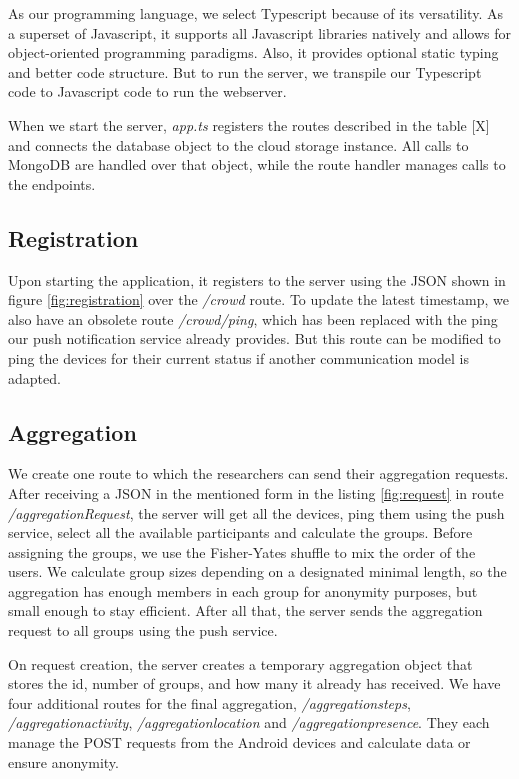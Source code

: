 As our programming language, we select Typescript because of its versatility. As a superset of Javascript, it supports all Javascript libraries natively and allows for object-oriented programming paradigms. Also, it provides optional static typing and better code structure. But to run the server, we transpile our Typescript code to Javascript code to run the webserver.

When we start the server, \textit{app.ts} registers the routes described in the table [X] and connects the database object to the cloud storage instance. All calls to MongoDB are handled over that object, while the route handler manages calls to the endpoints.

\subsection{Registration}

Upon starting the application, it registers to the server using the JSON shown in figure \ref{fig:registration} over the \textit{/crowd} route. To update the latest timestamp, we also have an obsolete route \textit{/crowd/ping}, which has been replaced with the ping our push notification service already provides. But this route can be modified to ping the devices for their current status if another communication model is adapted.

\subsection{Aggregation}

We create one route to which the researchers can send their aggregation requests. After receiving a JSON in the mentioned form in the listing \ref{fig:request} in route \textit{/aggregationRequest}, the server will get all the devices, ping them using the push service, select all the available participants and calculate the groups. Before assigning the groups, we use the Fisher-Yates shuffle to mix the order of the users. We calculate group sizes depending on a designated minimal length, so the aggregation has enough members in each group for anonymity purposes, but small enough to stay efficient. After all that, the server sends the aggregation request to all groups using the push service.

On request creation, the server creates a temporary aggregation object that stores the id, number of groups, and how many it already has received. We have four additional routes for the final aggregation, \textit{/aggregationsteps}, \textit{/aggregationactivity}, \textit{/aggregationlocation} and \textit{/aggregationpresence}. They each manage the POST requests from the Android devices and calculate data or ensure anonymity.

